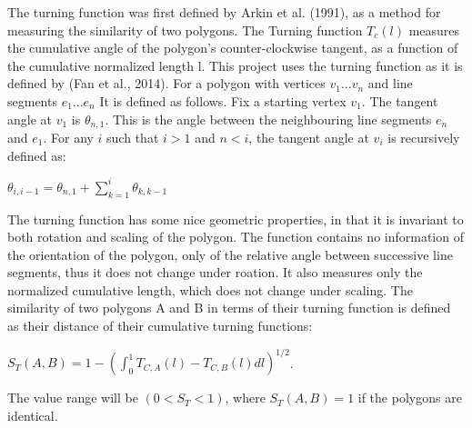\documentclass[a4paper]{article}
\begin{document}
The turning function was first defined by Arkin et al. (1991), as a method for measuring the similarity of two polygons. The Turning function $T_c(l)$ measures the cumulative angle of the polygon's counter-clockwise tangent, as a function of the cumulative normalized length l. This project uses the turning function as it is defined by (Fan et al., 2014). For a polygon with vertices ${v_1 ... v_n}$ and line segments ${e_1 ... e_n}$ It is defined as follows.
Fix a starting vertex $v_1$.
The tangent angle at $v_1$ is $\theta_{n,1}$. This is the angle between the neighbouring line segments $e_n$ and $e_1$.
For any $i$ such that $i>1$ and $n<i$, the tangent angle at $v_i$ is recursively defined as:
\begin{center}
    $\theta_{i, i-1} = \theta_{n,1} + \sum^{i}_{k=1} \theta_{k, k-1}$
\end{center}
The turning function has some nice geometric properties, in that it is invariant to both rotation and scaling of the polygon. The function contains no information of the orientation of the polygon, only of the relative angle between successive line segments, thus it does not change under roation. It also measures only the normalized cumulative length, which does not change under scaling.
The similarity of two polygons A and B in terms of their turning function is defined as their distance of their cumulative turning functions:
\begin{center}
    $S_{T}(A, B) = 1 - (\int^{1}_{0} T_{C,A}(l) - T_{C,B}(l) dl)^{1/2}$.
\end{center}
The value range will be $(0 < S_{T} < 1)$, where $S_{T}(A,B) = 1$ if the polygons are identical. 





\end{document}
